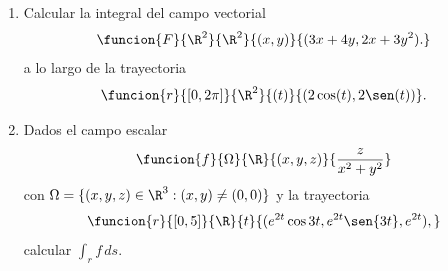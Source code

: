 \documentclass[a4,11pt]{aleph-examen}
\begin{document}
\begin{preguntas}
\begin{respuesta}
\begin{respuesta}
\begin{respuesta}
\begin{enumerate}
\begin{respuesta}
    Una parametrización de la recta es
    \[
        r(t)=(1-t,2-3t,3-2t)
    \]
    para $0 \leq t \leq 1$. Además
    \begin{align*}
        r'(t)=&(-1,-3,-2),\\
        \| r'(t) \| =& \sqrt[]{14}.
    \end{align*}
   	Aplicando la defición, se tiene que
  	\begin{align*}
        \int_C f(x,y,z) ds = \int_0^{1} (6-6t) \sqrt[]{14}\ dt =3 \sqrt[]{14}
    \end{align*}
\end{respuesta}

\item
	Calcular la integral del campo vectorial 
    \[
        \funcion{F}{\R^2}{\R^2}{(x,y)}{(3x+4y,2x+3y^2).}
    \]
    a lo largo de la trayectoria
    \[
        \funcion{r}{[0,2 \pi ]}{\R^2}{(t)}{(2 \cos (t), 2 \sen (t))}. 
    \]


\item Dados el campo escalar
    \[
        \funcion{f}{\Omega}{\R}
        {(x,y,z)}{\dfrac{z}{x^2 + y^2}}
	\]
	con $\Omega=\{(x,y,z)\in\R^3:(x,y)\neq (0,0)\}$
    y la trayectoria
	\[
        \funcion{r}{[0, 5]}{\R}
        {t}{(e^{2t}\cos{3t}, e^{2t}\sen{3t}, e^{2t}),}
	\]
    calcular $\displaystyle\int_{r}{f\, ds}$.
    

\end{enumerate}
\end{respuesta}
\end{respuesta}
\end{respuesta}
\end{preguntas}
\end{document}
